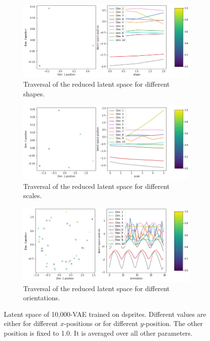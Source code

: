 \begin{figure}[H]
    \centering
    \begin{subfigure}{.48\textwidth}
        \includegraphics[width=\textwidth]{images/latent_space_traversals/vae_10000_dsprites_latent_space_values_shape.png}
        \caption{Traversal of the reduced latent space for different shapes.}
    \end{subfigure}
    \begin{subfigure}{.48\textwidth}
        \includegraphics[width=\textwidth]{images/latent_space_traversals/vae_10000_dsprites_latent_space_values_scale.png}
        \caption{Traversal of the reduced latent space for different scales.}
    \end{subfigure}
    \begin{subfigure}{.48\textwidth}
        \includegraphics[width=\textwidth]{images/latent_space_traversals/vae_10000_dsprites_latent_space_values_orientation.png}
        \caption{Traversal of the reduced latent space for different orientations.}
    \end{subfigure}
    \caption[\ac{VAE} on dsprites: Latent Space Values]{Latent space of 10,000-\ac{VAE} trained on dsprites. Different values are either for different $x$-positions or for different $y$-position. The other position is fixed to 1.0. It is averaged over all other parameters.}
    \label{fig:vae_dsprites_10000_latent_space_position}
\end{figure}

